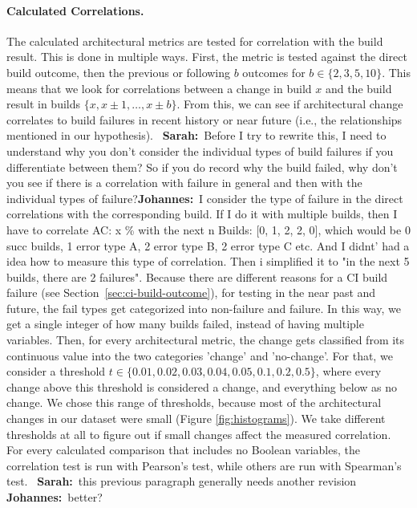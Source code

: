 \documentclass[sigplan, anonymous, review]{acmart}
\newcommand{\sn}[1]{{\color{blue}\textbf{Sarah:}~#1}}
\newcommand{\jk}[1]{{\color{violet}\textbf{Johannes:}~#1}}
\begin{document}
\paragraph{Calculated Correlations.}

The calculated architectural metrics are tested for correlation with the build result. This is done in multiple ways. First, the metric is tested against the direct build outcome, then the previous or following $b$ outcomes for $b \in \{2, 3, 5, 10\}$. This means that we look for correlations between a change in build $x$ and the build result in builds $\{x, x \pm 1, \hdots, x \pm b\}$. From this, we can see if architectural change correlates to build failures in recent history or near future (i.e., the relationships mentioned in our hypothesis). 
~\sn{Before I try to rewrite this, I need to  understand why you don't consider the individual types of build failures if you differentiate between them? So if you do record why the build failed, why don't you see if there is a correlation with failure in general and then with the individual types of failure?}\jk{I consider the type of failure in the direct correlations with the corresponding build. If I do it with multiple builds, then I have to correlate AC: x \% with the next n Builds: [0, 1, 2, 2, 0], which would be 0 succ builds, 1 error type A, 2 error type B, 2 error type C etc. And I didnt' had a idea how to measure this type of correlation. Then i simplified it to "in the next 5 builds, there are 2 failures".} Because there are different reasons for a CI build failure (see Section~\ref{sec:ci-build-outcome}), for testing in the near past and future, the fail types get categorized into non-failure and failure. In this way, we get a single integer of how many builds failed, instead of having multiple variables. 
Then, for every architectural metric, the change gets classified from its continuous value into the two categories 'change' and 'no-change'. For that, we consider a threshold $t \in \{0.01, 0.02, 0.03, 0.04, 0.05, 0.1, 0.2, 0.5\}$, where every change above this threshold is considered a change, and everything below as no change. 
We chose this range of thresholds, because most of the architectural changes in our dataset were small (Figure \ref{fig:histograms}). 
We take different thresholds at all to figure out if small changes affect the measured correlation. 
For every calculated comparison that includes no Boolean variables, the correlation test is run with Pearson's test, while others are run with Spearman's test. ~\sn{this previous paragraph generally needs another revision} \jk{better?}
\end{document}
